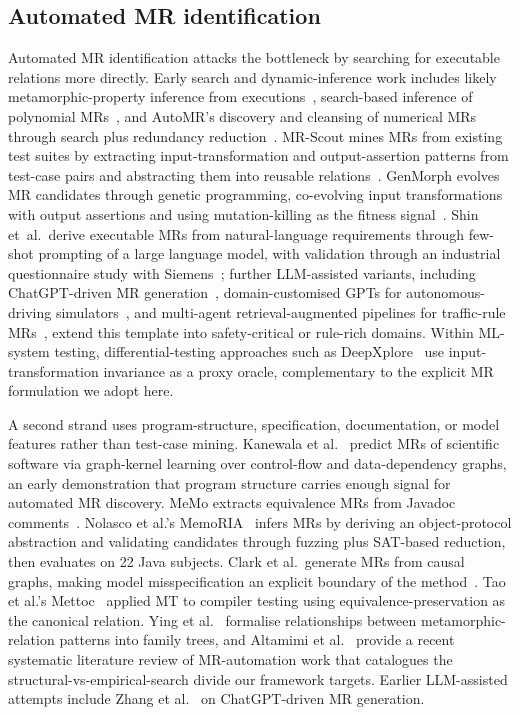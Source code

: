 \documentclass[acmsmall,screen,review]{acmart}
\begin{document}
\subsection{Automated MR identification}

Automated MR identification attacks the bottleneck by searching for executable relations more directly. Early search and dynamic-inference work includes likely metamorphic-property inference from executions~\cite{Su2015LikelyMR}, search-based inference of polynomial MRs~\cite{Zhang2014PolynomialMR}, and AutoMR's discovery and cleansing of numerical MRs through search plus redundancy reduction~\cite{Zhang2019AutoMR}. MR-Scout mines MRs from existing test suites by extracting input-transformation and output-assertion patterns from test-case pairs and abstracting them into reusable relations~\cite{MRScout2024}. GenMorph evolves MR candidates through genetic programming, co-evolving input transformations with output assertions and using mutation-killing as the fitness signal~\cite{GenMorph2024}. Shin et~al.\ derive executable MRs from natural-language requirements through few-shot prompting of a large language model, with validation through an industrial questionnaire study with Siemens~\cite{Shin2024}; further LLM-assisted variants, including ChatGPT-driven MR generation~\cite{ZhangChatGPTMR2023}, domain-customised GPTs for autonomous-driving simulators~\cite{GPTMR2025}, and multi-agent retrieval-augmented pipelines for traffic-rule MRs~\cite{AutoMT2025}, extend this template into safety-critical or rule-rich domains. Within ML-system testing, differential-testing approaches such as DeepXplore~\cite{DeepXplore2017} use input-transformation invariance as a proxy oracle, complementary to the explicit MR formulation we adopt here.

A second strand uses program-structure, specification, documentation, or model features rather than test-case mining. Kanewala et al.~\cite{Kanewala2016GraphKernel} predict MRs of scientific software via graph-kernel learning over control-flow and data-dependency graphs, an early demonstration that program structure carries enough signal for automated MR discovery. MeMo extracts equivalence MRs from Javadoc comments~\cite{Blasi2021MeMo}. Nolasco et al.'s MemoRIA~\cite{Nolasco2024MemoRIA} infers MRs by deriving an object-protocol abstraction and validating candidates through fuzzing plus SAT-based reduction, then evaluates on 22 Java subjects. Clark et al.\ generate MRs from causal graphs, making model misspecification an explicit boundary of the method~\cite{Clark2023CausalMT}. Tao et al.'s Mettoc~\cite{Tao2010Mettoc} applied MT to compiler testing using equivalence-preservation as the canonical relation. Ying et al.~\cite{Ying2025MRPatterns} formalise relationships between metamorphic-relation patterns into family trees, and Altamimi et al.~\cite{Altamimi2022MRSLR} provide a recent systematic literature review of MR-automation work that catalogues the structural-vs-empirical-search divide our framework targets. Earlier LLM-assisted attempts include Zhang et al.~\cite{ZhangChatGPTMR2023} on ChatGPT-driven MR generation.
\end{document}
